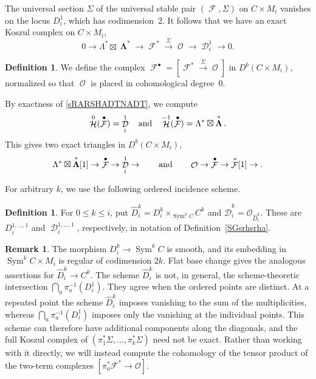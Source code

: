 \documentclass[11pt,letterpaper]{amsart}
\theoremstyle{plain}
\theoremstyle{definition}
\newtheorem{definition}[theorem]{Definition}
\newtheorem{remark}[theorem]{Remark}
\theoremstyle{remark}
\numberwithin{equation}{section}
\DeclareMathOperator{\Sym}{Sym}
\DeclareMathOperator{\cD}{\mathcal{D}}
\DeclareMathOperator{\cH}{\mathcal{H}}
\DeclareMathOperator{\cF}{\mathcal{F}}
\DeclareMathOperator{\cO}{\mathcal{O}}
\DeclareMathOperator{\bLambda}{{\boldsymbol\Lambda}}
\def\arrow{\mathop{\longrightarrow}\limits}
\begin{document}
The universal section $\Sigma$ of the universal stable pair $(\cF,\Sigma)$ on $C\times M_i$
vanishes on the locus $D_i^1$, which has codimension~$2$. 
It follows that  we have an exact Koszul complex on $C\times M_i$,
\begin{equation}\label{sRARSHADTNADT}
0\to \Lambda^*\boxtimes\bLambda^*\to\cF^*\arrow^\Sigma\cO\to\cD_i^1\to0.
\end{equation}


\begin{definition}\label{def:universal-two-term}
We define the complex $\cF^\bullet=[\cF^*\arrow^\Sigma\cO]$ in $D^b(C\times M_i)$, normalized so that $\cO$ is placed in cohomological degree~$0$. 
\end{definition}



By exactness of \eqref{sRARSHADTNADT}, we compute 
\begin{equation}\label{sbasrhasrha}
\cH^{0}(\cF^\bullet)=\cD_i^1\quad\hbox{\rm and}\quad \cH^{-1}(\cF^\bullet)=\Lambda^*\boxtimes\bLambda^*.
\end{equation}
This gives two exact triangles in $D^b(C\times M_i)$,
\begin{equation}\label{dfghsdrgadrghadrgha}
\Lambda^*\boxtimes\bLambda^*[1]\to\cF^\bullet\to\cD_i^1\to
\qquad\hbox{\rm and}\qquad 
\cO\to\cF^\bullet\to\cF^*[1]\to.
\end{equation}

For arbitrary $k$, we use the following ordered incidence scheme.


\begin{definition}\label{def:ordered-incidence}
For $0\le k\le i$, put
$\widehat D_i^k=D_i^k\times_{\Sym^kC}C^k$ and
$\widehat{\mathcal D}_i^k=\mathcal O_{\widehat D_i^k}$.
These are $D_i^{1,\ldots,1}$ and $\cD_i^{1,\ldots,1}$, respectively,
in notation of Definition~\ref{SGsrhsrha}.
\end{definition}


\begin{remark}
The morphism $D_i^k\to\operatorname{Sym}^kC$ is smooth, and its
embedding in $\operatorname{Sym}^kC\times M_i$ is regular of codimension
$2k$.  Flat base change gives the analogous assertions for
$\widehat D_i^k\to C^k$.
The scheme $\widehat D_i^k$ is not, in general, the scheme-theoretic
intersection $\bigcap_a\pi_a^{-1}(D_i^1)$.  They agree when the ordered
points are distinct.  At a repeated point the scheme $\widehat D_i^k$ imposes vanishing
to the sum of the multiplicities, whereas $\bigcap_a\pi_a^{-1}(D_i^1)$ imposes only the
vanishing at the individual points.  This scheme can
therefore have additional components along the diagonals, and the full
Koszul complex of $(\pi_1^*\Sigma,\ldots,\pi_k^*\Sigma)$ need not be
exact.  Rather than working with it directly, we will instead compute the cohomology of the tensor product of
the two-term complexes $[\pi_a^*\mathcal F^*\to\mathcal O]$.
\end{remark}
\end{document}
